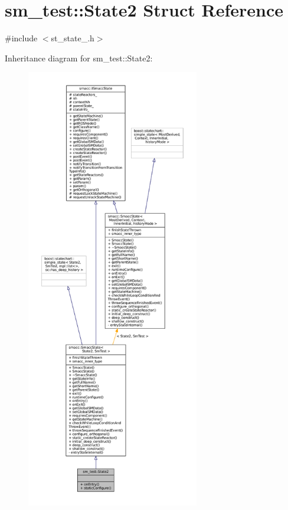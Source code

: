 \hypertarget{structsm__test_1_1State2}{}\section{sm\+\_\+test\+:\+:State2 Struct Reference}
\label{structsm__test_1_1State2}


{\ttfamily \#include $<$st\+\_\+state\+\_.\+h$>$}



Inheritance diagram for sm\+\_\+test\+:\+:State2\+:
\nopagebreak
\begin{figure}[H]
\begin{center}
\leavevmode
\includegraphics[height=550pt]{structsm__test_1_1State2__inherit__graph}
\end{center}
\end{figure}


